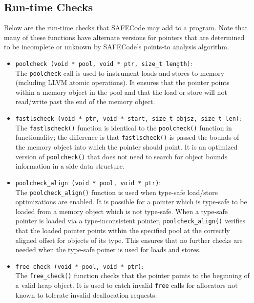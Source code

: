 \subsection{Run-time Checks}
\label{section:checks:checks}

Below are the run-time checks that SAFECode may add to a program.
Note that many of these functions have alternate versions for pointers
that are determined to be incomplete or unknown by SAFECode's
points-to analysis algorithm.

\begin{itemize}
\item{\tt poolcheck (void * pool, void * ptr, size\_t length)}: \\
The {\tt poolcheck} call is used to instrument loads and stores to
memory (including LLVM atomic operations).  It ensures that the
pointer points within a memory object in the pool and that the load or
store will not read/write past the end of the memory object.

\item{\tt fastlscheck (void * ptr, void * start, size\_t objsz,
size\_t len)}: \\
The {\tt fastlscheck()} function is identical to the {\tt poolcheck()}
function in functionality; the difference is that {\tt fastlscheck()}
is passed the bounds of the memory object into which the pointer
should point.  It is an optimized version of {\tt poolcheck()} that
does not need to search for object bounds information in a side data
structure.

\item{\tt poolcheck\_align (void * pool, void * ptr)}: \\
The {\tt poolcheck\_align()} function is used when type-safe
load/store optimizations are enabled.  It is possible for a pointer which
is type-safe to be loaded from a memory object which is not type-safe.
When a type-safe pointer is loaded via a type-inconsistent pointer,
{\tt poolcheck\_align()} verifies that the loaded pointer points
within the specified pool at the correctly aligned offset for objects
of its type.  This ensures that no further checks are needed when the
type-safe poiner is used for loads and stores.

\item{\tt free\_check (void * pool, void * ptr)}: \\
The {\tt free\_check()} function checks that the pointer points to
the beginning of a valid heap object.  It is used to catch invalid
{\tt free} calls for allocators not known to tolerate invalid
deallocation requests.


\end{itemize}
